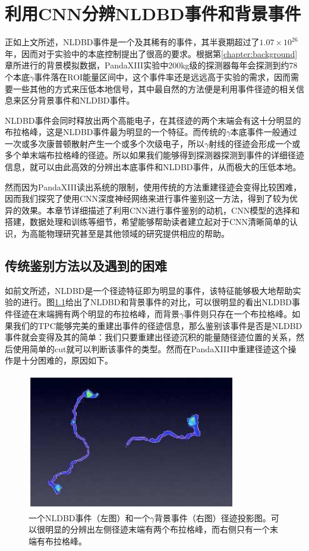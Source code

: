
\chapter{利用CNN分辨NLDBD事件和背景事件}
\label{chapter:cnn}

正如上文所述，NLDBD事件是一个及其稀有的事件，其半衰期超过了$1.07\times10^{26}$年，因而对于实验中的本底控制提出了很高的要求。根据第\ref{chapter:background}章所进行的背景模拟数据，PandaXIII实验中200kg级的探测器每年会探测到约78个本底$\gamma$事件落在ROI能量区间中，这个事件率还是远远高于实验的需求，因而需要一些其他的方式来压低本地信号，其中最自然的方法便是利用事件径迹的相关信息来区分背景事件和NLDBD事件。

NLDBD事件会同时释放出两个高能电子，在其径迹的两个末端会有这十分明显的布拉格峰，这是NLDBD事件最为明显的一个特征。而传统的$\gamma$本底事件一般通过一次或多次康普顿散射产生一个或多个次级电子，所以$\gamma$射线的径迹会形成一个或多个单末端布拉格峰的径迹。所以如果我们能够得到探测器探测到事件的详细径迹信息，就可以由此高效的分辨出本底事件和NLDBD事件，从而极大的压低本地。

然而因为PandaXIII读出系统的限制，使用传统的方法重建径迹会变得比较困难，因而我们探究了使用CNN深度神经网络来进行事件鉴别这一方法，得到了较为优异的效果。本章节详细描述了利用CNN进行事件鉴别的动机，CNN模型的选择和搭建，数据处理和训练等细节，希望能够帮助读者建立起对于CNN清晰简单的认识，为高能物理研究甚至是其他领域的研究提供相应的帮助。

\section{传统鉴别方法以及遇到的困难}

如前文所述，NLDBD是一个径迹特征即为明显的事件，该特征能够极大地帮助实验的进行。图\ref{fig:samples}给出了NLDBD和背景事件的对比，可以很明显的看出NLDBD事件径迹在末端拥有两个明显的布拉格峰，而背景$\gamma$事件则只存在一个布拉格峰。如果我们的TPC能够完美的重建出事件的径迹信息，那么鉴别该事件是否是NLDBD事件就会变得及其的简单：我们只要重建出径迹沉积的能量随径迹位置的关系，然后使用简单的cut就可以判断该事件的类型。然而在PandaXIII中重建径迹这个操作是十分困难的，原因如下。

\begin{figure}[hbt]
    \centering
    \includegraphics[width=0.5\columnwidth]{pic/fig10.png}
    \caption{一个NLDBD事件（左图）和一个$\gamma$背景事件（右图）径迹投影图。可以很明显的分辨出左侧径迹末端有两个布拉格峰，而右侧只有一个末端有布拉格峰。}
    \label{fig:samples}
\end{figure}

